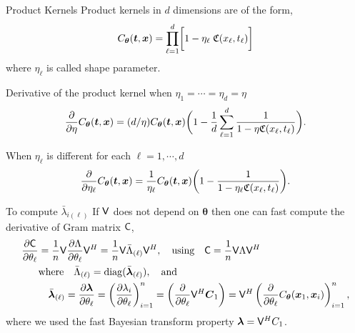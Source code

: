 \documentclass[handout, 10pt,compress,xcolor={usenames,dvipsnames}]{beamer} %
\newcommand{\bm}[1]{\boldsymbol{#1}}
\renewcommand{\mLambda}{\Lambda}
\newcommand{\vC}{\bvec{C}}
\renewcommand{\vtheta}{{\bm{\theta}}}
\begin{document}
\begin{frame}{Product Kernels}
	Product kernels in $d$ dimensions are of the form,
	\begin{align}
	\label{eqn:prod_kernel}
	C_{\vtheta}(\vt, \vx) = 
	\prod_{\ell=1}^d \biggl[ 1 - \eta_\ell \; \mathfrak{C}(x_\ell,t_\ell) \biggr]
	\end{align}
	where $\eta_\ell$ is called shape parameter.
	
	Derivative of the product kernel when $\eta_1=\cdots=\eta_d=\eta$
	\begin{align*}
	\frac{\partial}{\partial \eta} C_{\vtheta}(\vt, \vx) = ({d}/{\eta} ) C_{\vtheta}(\vt, \vx) 
	\biggl(
	1 - 
	\frac{1}{d} \sum_{\ell=1}^d
	\frac{1}
	{ 1 - \eta \mathfrak{C}(x_\ell,t_\ell) }
	\biggr).
	\end{align*}
	
	When $\eta_\ell$ is different for each $\ell = 1,\cdots,d$
	\begin{align*}
	\frac{\partial}{\partial \eta_\ell} C_{\vtheta}(\vt, \vx) = \frac{1}{\eta_\ell} 
	{ C_{\vtheta}(\vt, \vx) }
	\biggl(
	1 - 
	\frac{1}
	{ 1 - \eta_\ell \mathfrak{C}(x_\ell,t_\ell) }
	\biggr).
	\end{align*}
\end{frame}








\begin{frame}{To compute $\bar{\lambda}_{i(\ell)}$}
	If $\mathsf{V}$ does not depend on $\vtheta$ then one can fast compute the derivative of Gram matrix $\mathsf{C}$,
	\begin{align}
	\nonumber
	\displaystyle \frac{\partial \mC}{\partial \theta_\ell} 
	& = \frac 1n \mV \frac{\partial {\mLambda}}{\partial \theta_\ell} \mV^H
	= \frac 1n \mV \bar{\mLambda}_{(\ell)} \mV^H, \quad
	\text{using} \quad  \mC = \frac 1n \mV \mLambda \mV^H
	\\
	\nonumber
	& \text{where} \quad \bar{\mLambda}_{(\ell)} = \diag(\bar{\vlambda}_{(\ell)}), \quad \text{and}
	\\
	\label{eqn:deriv_eigenval_gram_matrix}
	&  \quad \bar{\vlambda}_{(\ell)} = \frac{\partial \vlambda}{\partial \theta_\ell} = \left( \frac{\partial \lambda_i}{\partial \theta_\ell} \right)_{i=1}^n 
	= \left( \frac{\partial }{\partial \theta_\ell} \mV^H {\vC_1} \right)
	= \mV^H \left( \frac{\partial }{\partial \theta_\ell} {C_\vtheta(\vx_1,\vx_i)} \right)_{i=1}^n,
	\end{align}
	where we used the fast Bayesian transform property $\boldsymbol{\lambda} = \mathsf{V}^H C_1$. %
\end{frame}
\end{document}
